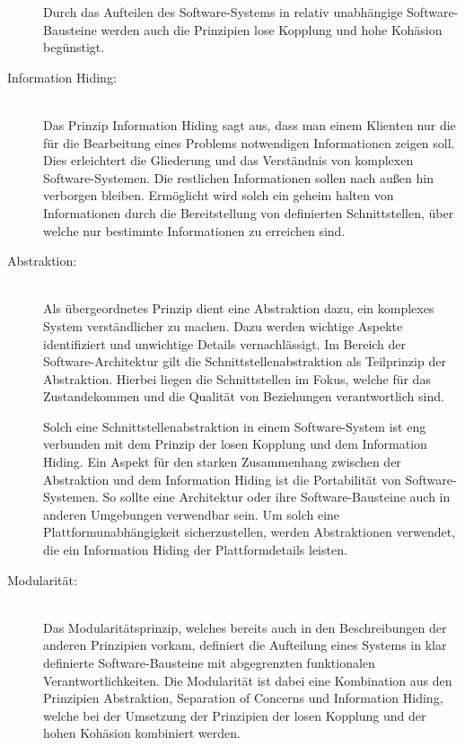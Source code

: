\begin{description}
    Durch das Aufteilen des Software-Systems in relativ unabhängige Software-Bausteine werden auch die Prinzipien lose Kopplung und hohe Kohäsion begünstigt.

    \item[Information Hiding:]\hfill \\
    Das Prinzip Information Hiding sagt aus, dass man einem Klienten nur die für die Bearbeitung eines Problems notwendigen Informationen zeigen soll. Dies erleichtert die Gliederung und das Verständnis von komplexen Software-Systemen. Die restlichen Informationen sollen nach außen hin verborgen bleiben. Ermöglicht wird solch ein \glqq geheim halten\grqq{} von Informationen durch die Bereitstellung von definierten Schnittstellen, über welche nur bestimmte Informationen zu erreichen sind.

    \item[Abstraktion:]\hfill \\
    Als übergeordnetes Prinzip dient eine Abstraktion dazu, ein komplexes System verständlicher zu machen. Dazu werden wichtige Aspekte identifiziert und unwichtige Details vernachlässigt. Im Bereich der Software-Architektur gilt die Schnittstellenabstraktion als Teilprinzip der Abstraktion. Hierbei liegen die Schnittstellen im Fokus, welche für das Zustandekommen und die Qualität von Beziehungen verantwortlich sind.

    Solch eine Schnittstellenabstraktion in einem Software-System ist eng verbunden mit dem Prinzip der losen Kopplung und dem Information Hiding. Ein Aspekt für den starken Zusammenhang zwischen der Abstraktion und dem Information Hiding ist die Portabilität von Software-Systemen. So sollte eine Architektur oder ihre Software-Bausteine auch in anderen Umgebungen verwendbar sein. Um solch eine Plattformunabhängigkeit sicherzustellen, werden Abstraktionen verwendet, die ein Information Hiding der Plattformdetails leisten.

    \item[Modularität:]\hfill \\
    Das Modularitätsprinzip, welches bereits auch in den Beschreibungen der anderen Prinzipien vorkam, definiert die Aufteilung eines Systems in klar definierte Software-Bausteine mit abgegrenzten funktionalen Verantwortlichkeiten. Die Modularität ist dabei eine Kombination aus den Prinzipien Abstraktion, Separation of Concerns und Information Hiding, welche bei der Umsetzung der Prinzipien der losen Kopplung und der hohen Kohäsion kombiniert werden.

\end{description}

